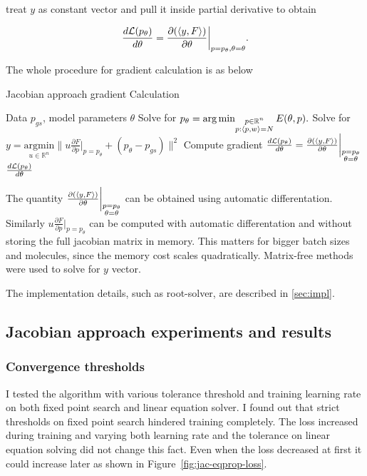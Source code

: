 \documentclass[a4paper,10pt]{report}
\begin{document}
treat $y$ as constant vector and pull it inside partial derivative to obtain

\begin{equation}
 \frac{d\mathcal{L}(p_\theta)}{d \theta} =   \frac{\partial (\langle y, F \rangle)}{\partial \theta}\bigg|_{p=p_\theta, \theta=\theta}.
\end{equation}



The whole procedure for gradient calculation is as below
\begin{algorithm}[H]
\caption{Jacobian approach gradient Calculation}
\begin{algorithmic}[1]
\Require Data $p_{gs}$, model parameters $\theta$
\State  Solve for $p_\theta  = \operatorname*{arg\,min}_{\substack{p \in \mathbb{R}^n \\ p: \langle p, w \rangle=N }} E(\theta, p).$
\State Solve for $y = \underset{u\in \mathbb{R}^n}{\mathrm{argmin}} \bigg\|u \frac{\partial F}{\partial p}\bigg|_{p=p_\theta} + (p_\theta-p_{gs})\bigg\|^2$
\State Compute gradient $\frac{d\mathcal{L}(p_\theta)}{d \theta} = \frac{\partial (\langle y, F \rangle)}{\partial \theta}\bigg|_{\substack{p=p_\theta \\\theta= \theta}}$
\State \Return $\frac{d\mathcal{L}(p_\theta)}{d \theta}$
\end{algorithmic}
\end{algorithm}


The quantity $\frac{\partial (\langle y, F \rangle)}{\partial \theta}\bigg|_{\substack{p=p_\theta \\\theta= \theta}}$ can be obtained using automatic differentation.  Similarly $u \frac{\partial F}{\partial p}\bigg|_{p=p_\theta}$ can be computed with automatic differentation and without storing the full jacobian matrix in memory. This matters for bigger batch sizes and molecules, since the memory cost scales quadratically. Matrix-free methods were used to solve for $y$ vector.


The implementation details, such as root-solver, are described in \ref{sec:impl}.

\subsection{Jacobian approach experiments and results}

\subsubsection{Convergence thresholds}
 I tested the algorithm with various tolerance threshold and training learning rate on both fixed point search and linear equation solver.
I found out that strict thresholds on fixed point search hindered training completely. The loss increased during training and varying both learning rate and the tolerance on linear equation solving did not change this fact. Even when the loss decreased at first it could increase later as shown in Figure~\ref{fig:jac-eqprop-loss}.
\end{document}
